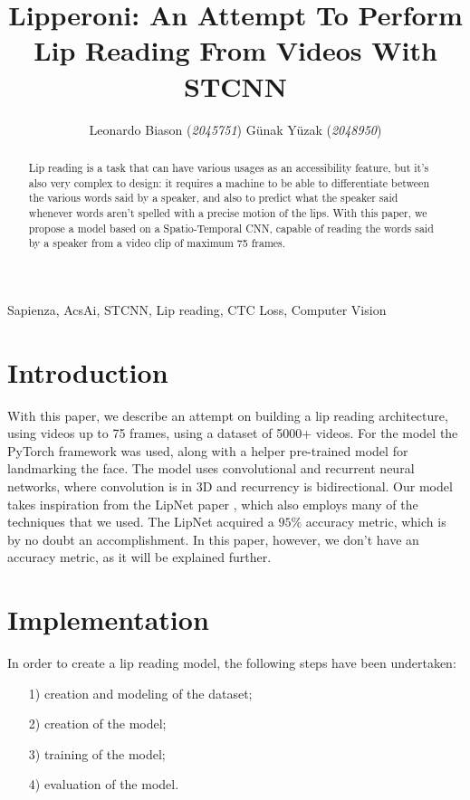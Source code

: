 \documentclass[11pt,journal]{IEEEtran}
\title{Lipperoni: An Attempt To Perform Lip Reading From Videos With STCNN}
\author{Leonardo Biason (\textit{2045751}) \quad Günak Yüzak (\textit{2048950})}
\begin{document}
\maketitle

\begin{abstract}
    Lip reading is a task that can have various usages as an accessibility feature, but it's also very complex to design: it requires a machine to be able to differentiate between the various words said by a speaker, and also to predict what the speaker said whenever words aren't spelled with a precise motion of the lips. With this paper, we propose a model based on a Spatio-Temporal CNN, capable of reading the words said by a speaker from a video clip of maximum 75 frames.
\end{abstract}

\begin{keywords}
    Sapienza, AcsAi, STCNN, Lip reading, CTC Loss, Computer Vision 
\end{keywords}

\section{Introduction}

With this paper, we describe an attempt on building a lip reading architecture, using videos up to 75 frames, using a dataset of 5000+ videos. For the model the PyTorch framework was used, along with a helper pre-trained model for landmarking the face. The model uses convolutional and recurrent neural networks, where convolution is in 3D and recurrency is bidirectional.
Our model takes inspiration from the LipNet paper \cite{lipnet}, which also employs many of the techniques that we used. The LipNet acquired a $95\%$ accuracy metric, which is by no doubt an accomplishment. In this paper, however, we don't have an accuracy metric, as it will be explained further.

 
\section{Implementation }

In order to create a lip reading model, the following steps have been undertaken:
\begin{itemize}
    \item [1)] creation and modeling of the dataset;
    \item [2)] creation of the model;
    \item [3)] training of the model;
    \item [4)] evaluation of the model.
\end{itemize}
\end{document}
